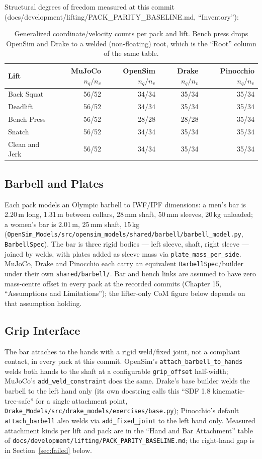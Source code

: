 \documentclass[11pt,a4paper]{article}
\begin{document}
Structural degrees of freedom measured at this commit
(docs/development/lifting/PACK\_PARITY\_BASELINE.md, ``Inventory''):

\begin{table}[h]
\centering\small
\begin{tabular}{lrrrr}
\toprule
Lift & MuJoCo $n_q/n_v$ & OpenSim $n_q/n_v$ & Drake $n_q/n_v$ & Pinocchio $n_q/n_v$\\
\midrule
Back Squat      & 56/52 & 34/34 & 35/34 & 35/34\\
Deadlift        & 56/52 & 34/34 & 35/34 & 35/34\\
Bench Press     & 56/52 & 28/28 & 28/28 & 35/34\\
Snatch          & 56/52 & 34/34 & 35/34 & 35/34\\
Clean and Jerk  & 56/52 & 34/34 & 35/34 & 35/34\\
\bottomrule
\end{tabular}
\caption{Generalized coordinate/velocity counts per pack and lift. Bench
press drops OpenSim and Drake to a welded (non-floating) root, which is the
``Root'' column of the same table.}
\end{table}

\subsection{Barbell and Plates}
Each pack models an Olympic barbell to IWF/IPF dimensions: a men's bar is
2.20\,m long, 1.31\,m between collars, 28\,mm shaft, 50\,mm sleeves, 20\,kg
unloaded; a women's bar is 2.01\,m, 25\,mm shaft, 15\,kg
(\texttt{OpenSim\_Models/src/opensim\_models/shared/barbell/barbell\_model.py},
\texttt{BarbellSpec}). The bar is three rigid bodies --- left sleeve, shaft,
right sleeve --- joined by welds, with plates added as sleeve mass via
\texttt{plate\_mass\_per\_side}. MuJoCo, Drake and Pinocchio each carry an
equivalent \texttt{BarbellSpec}/builder under their own \texttt{shared/barbell/}.
Bar and bench links are assumed to have zero mass-centre offset in every pack
at the recorded commits (Chapter 15, ``Assumptions and Limitations''); the lifter-only CoM
figure below depends on that assumption holding.

\subsection{Grip Interface}
The bar attaches to the hands with a rigid weld/fixed joint, not a compliant
contact, in every pack at this commit. OpenSim's \texttt{attach\_barbell\_to\_hands}
welds both hands to the shaft at a configurable \texttt{grip\_offset}
half-width; MuJoCo's \texttt{add\_weld\_constraint} does the same. Drake's
base builder welds the barbell to the left hand only (its own docstring calls
this ``SDF 1.8 kinematic-tree-safe'' for a single attachment point,
\texttt{Drake\_Models/src/drake\_models/exercises/base.py}); Pinocchio's
default \texttt{attach\_barbell} also welds via \texttt{add\_fixed\_joint} to
the left hand only. Measured attachment kinds per lift and pack are in the
``Hand and Bar Attachment'' table of
\texttt{docs/development/lifting/PACK\_PARITY\_BASELINE.md}; the right-hand
gap is in Section~\ref{sec:failed} below.
\end{document}
